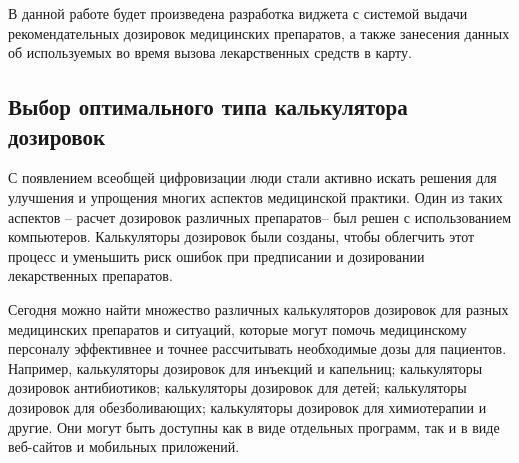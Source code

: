 В данной работе будет произведена разработка виджета с системой выдачи рекомендательных дозировок медицинских препаратов, а также занесения данных об используемых во время вызова лекарственных средств в карту.

\subsection{Выбор оптимального типа калькулятора дозировок}
С появлением всеобщей цифровизации люди стали активно искать решения для улучшения и упрощения многих аспектов медицинской практики. Один из таких аспектов – расчет дозировок различных препаратов– был решен с использованием компьютеров. Калькуляторы дозировок были созданы, чтобы облегчить этот процесс и уменьшить риск ошибок при предписании и дозировании лекарственных препаратов.

Сегодня можно найти множество различных калькуляторов дозировок для разных медицинских препаратов и ситуаций, которые могут помочь медицинскому персоналу эффективнее и точнее рассчитывать необходимые дозы для пациентов. Например, калькуляторы дозировок для инъекций и капельниц; калькуляторы дозировок антибиотиков; калькуляторы дозировок для детей; калькуляторы дозировок для обезболивающих; калькуляторы дозировок для химиотерапии и другие. Они могут быть доступны как в виде отдельных программ, так и в виде веб-сайтов и мобильных приложений.

